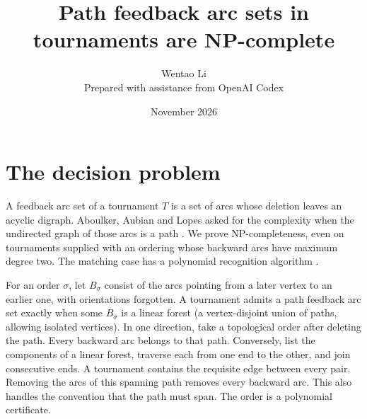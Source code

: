 \documentclass[10pt]{article}
\title{Path feedback arc sets in tournaments are NP-complete}
\author{Wentao Li\\[2pt]\small Prepared with assistance from OpenAI Codex}
\date{November 2026}
\begin{document}
\maketitle
\section{The decision problem}
A feedback arc set of a tournament $T$ is a set of arcs whose deletion leaves an acyclic digraph. Aboulker, Aubian and Lopes asked for the complexity when the undirected graph of those arcs is a path \cite[Problem 4.4]{aal}. We prove NP-completeness, even on tournaments supplied with an ordering whose backward arcs have maximum degree two. The matching case has a polynomial recognition algorithm \cite{dir}.

For an order $\sigma$, let $B_\sigma$ consist of the arcs pointing from a later vertex to an earlier one, with orientations forgotten. A tournament admits a path feedback arc set exactly when some $B_\sigma$ is a linear forest (a vertex-disjoint union of paths, allowing isolated vertices). In one direction, take a topological order after deleting the path. Every backward arc belongs to that path. Conversely, list the components of a linear forest, traverse each from one end to the other, and join consecutive ends. A tournament contains the requisite edge between every pair. Removing the arcs of this spanning path removes every backward arc. This also handles the convention that the path must span. The order is a polynomial certificate.
\end{document}
